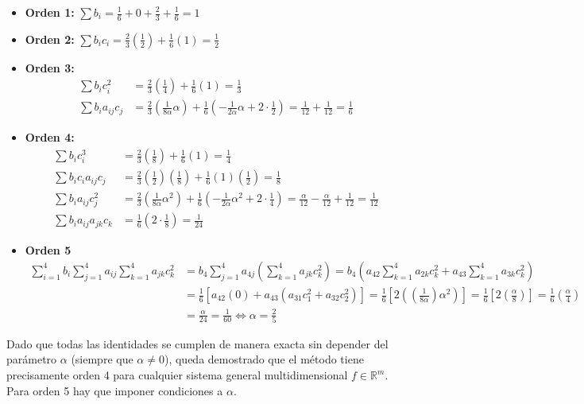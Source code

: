 \begin{sol}
\begin{itemize}
    \item \textbf{Orden 1:} $\sum b_i = \frac{1}{6} + 0 + \frac{2}{3} + \frac{1}{6} = 1$
    \item \textbf{Orden 2:} $\sum b_i c_i = \frac{2}{3}\left(\frac{1}{2}\right) + \frac{1}{6}(1) = \frac{1}{2}$
    \item \textbf{Orden 3:} 
    \begin{align*}
        \sum b_i c_i^2 &= \frac{2}{3}\left(\frac{1}{4}\right) + \frac{1}{6}(1) = \frac{1}{3} \\
        \sum b_i a_{ij} c_j &= \frac{2}{3}\left(\frac{1}{8\alpha} \alpha\right) + \frac{1}{6}\left(-\frac{1}{2\alpha} \alpha + 2 \cdot \frac{1}{2}\right) = \frac{1}{12} + \frac{1}{12} = \frac{1}{6}
    \end{align*}
    \item \textbf{Orden 4:}
    \begin{align*}
        \sum b_i c_i^3 &= \frac{2}{3}\left(\frac{1}{8}\right) + \frac{1}{6}(1) = \frac{1}{4} \\
        \sum b_i c_i a_{ij} c_j &= \frac{2}{3}\left(\frac{1}{2}\right)\left(\frac{1}{8}\right) + \frac{1}{6}(1)\left(\frac{1}{2}\right) = \frac{1}{8} \\
        \sum b_i a_{ij} c_j^2 &= \frac{2}{3}\left(\frac{1}{8\alpha} \alpha^2\right) + \frac{1}{6}\left(-\frac{1}{2\alpha} \alpha^2 + 2 \cdot \frac{1}{4}\right) = \frac{\alpha}{12} - \frac{\alpha}{12} + \frac{1}{12} = \frac{1}{12} \\
        \sum b_i a_{ij} a_{jk} c_k &= \frac{1}{6}\left(2 \cdot \frac{1}{8}\right) = \frac{1}{24}
    \end{align*}
    \item \textbf{Orden 5}
    \begin{align*} 
        \sum_{i=1}^4 b_i \sum_{j=1}^4 a_{ij} \sum_{k=1}^4 a_{jk} c_k^2 &= b_4 \sum_{j=1}^4 a_{4j} \left( \sum_{k=1}^4 a_{jk} c_k^2 \right) = b_4 \left( a_{42} \sum_{k=1}^4 a_{2k} c_k^2 + a_{43} \sum_{k=1}^4 a_{3k} c_k^2 \right) \\ &= \frac{1}{6} \left[ a_{42}(0) + a_{43} \left( a_{31} c_1^2 + a_{32} c_2^2 \right) \right] = \frac{1}{6} \left[ 2 \left( \left(\frac{1}{8\alpha}\right) \alpha^2 \right) \right] = \frac{1}{6} \left[ 2 \left( \frac{\alpha}{8} \right) \right] = \frac{1}{6} \left( \frac{\alpha}{4} \right) \\ &= \frac{\alpha}{24} = \frac{1}{60} \iff \alpha=\frac{2}{5} \end{align*}
\end{itemize}
Dado que todas las identidades se cumplen de manera exacta sin depender del parámetro $\alpha$ (siempre que $\alpha \neq 0$), queda demostrado que el método tiene precisamente orden 4 para cualquier sistema general multidimensional $f \in \mathbb{R}^m$. Para orden 5 hay que imponer condiciones a $\alpha$. 

\end{sol}
